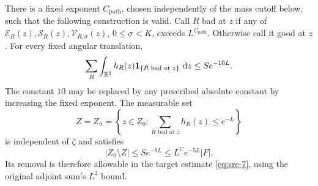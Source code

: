 \begin{lemma}
\label{hier:good-paths}
There is a fixed exponent $C_{\mathrm{path}}$, chosen independently of
the mass cutoff below, such that the following construction is valid.
Call $R$ bad at $z$ if any of
$\mathcal E_R(z),\mathcal S_R(z),\mathcal V_{R,\sigma}(z)$,
$0\le\sigma<K$, exceeds $L^{C_{\mathrm{path}}}$.  Otherwise call it
good at $z$.  For every fixed angular translation,
\begin{equation}
 \sum_R\int_{\mathbb R^2}h_R(z)\mathbf 1_{\{R\text{ bad at }z\}}\,\,\mathrm d z
 \le S e^{-10L}.
 \label{hier:weighted-bad-paths}
\end{equation}
The constant $10$ may be replaced by any prescribed absolute constant
by increasing the fixed exponent.  The measurable set
\begin{equation}
 Z=Z_\vartheta
 =\left\{z\in Z_0:
       \sum_{R\text{ bad at }z}h_R(z)\le e^{-L}\right\}
 \label{hier:good-set}
\end{equation}
is independent of $\zeta$ and satisfies
\begin{equation}
 |Z_0\setminus Z|\le S e^{-9L}
 \le L^Ce^{-5L}|F|.
 \label{hier:good-set-budget}
\end{equation}
Its removal is therefore allowable in the target estimate
\eqref{eq:src-7}, using the original adjoint sum's $L^2$ bound.
\end{lemma}

